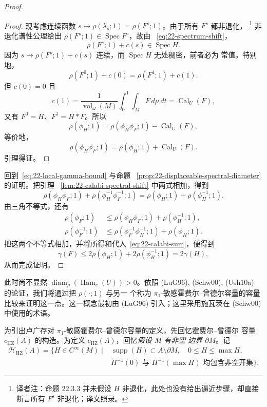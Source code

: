 \begin{proof}
\begin{proof}
现考虑连续函数 $s\mapsto\rho(\lambda_s;1)=\rho(F^s;1)$。由于所有 $F^s$ 都非退化，
\footnote{译者注：命题 22.3.3 并未假设 $H$ 非退化，此处也没有给出逼近步骤，却直接
断言所有 $F^s$ 非退化；译文照录。}
非退化谱性公理给出 $\rho(F^s;1)\in\operatorname{Spec}F^s$，故由
~\eqref{eq:22-spectrum-shift}，
\[
 \rho(F^s;1)+c(s)\in\operatorname{Spec}H.
\]
因为 $s\mapsto\rho(F^s;1)+c(s)$ 连续，而 $\operatorname{Spec}H$ 无处稠密，前者必为
常值。特别地，
\[
 \rho(F^0;1)+c(0)=\rho(F^1;1)+c(1).
\]
但 $c(0)=0$ 且
\[
 c(1)=\frac1{\operatorname{vol}_\omega(M)}
 \int_0^1\int_MF\,d\mu\,dt=\operatorname{Cal}_U(F),
\]
又有 $F^0=H$、$F^1=H*F$。所以
\[
 \rho(\phi_H;1)=\rho(\phi_H\phi_F;1)-\operatorname{Cal}_U(F),
\]
等价地，
\begin{equation}
 \rho(\phi_H\phi_F;1)=\rho(\phi_H;1)+\operatorname{Cal}_U(F).
 \label{eq:22-calabi-shift}
\end{equation}
引理得证。
\end{proof}


回到~\eqref{eq:22-local-gamma-bound} 与命题
~\ref{prop:22-displaceable-spectral-diameter} 的证明。把引理
~\ref{lem:22-calabi-spectral-shift} 中两式相加，得到
\begin{equation}
 \rho(\phi_H\phi_F;1)+\rho(\phi_H^{-1}\phi_F^{-1};1)
 =\rho(\phi_H;1)+\rho(\phi_H^{-1};1).
 \label{eq:22-calabi-sum}
\end{equation}
由三角不等式，还有
\[
 \begin{aligned}
 \rho(\phi_F;1)&\leq\rho(\phi_H\phi_F;1)+\rho(\phi_H^{-1};1),\\
 \rho(\phi_F^{-1};1)&\leq
 \rho(\phi_F^{-1}\phi_H^{-1};1)+\rho(\phi_H;1).
 \end{aligned}
\]
把这两个不等式相加，并将所得和代入~\eqref{eq:22-calabi-sum}，便得到
\[
 \gamma(F)\leq2\rho(\phi_H;1)+2\rho(\phi_H^{-1};1)=2\gamma(H),
\]
从而完成证明。
\end{proof}

此时尚不显然 $\operatorname{diam}_\rho(\operatorname{Ham}_c(U))>0$。依照
(LuG96), (Schw00), (Ush10a) 的论证，我们将通过把 $\rho(\mathord\cdot;1)$ 与另一
个称为 $\pi_1$-敏感霍费尔--曾德尔容量的容量比较来证明这一点。这一概念最初由\personLu{} (LuG96)
引入；这里采用施瓦茨在 (Schw00) 中使用的术语。

为引出卢广存对 $\pi_1$-敏感霍费尔--曾德尔容量的定义，先回忆霍费尔--曾德尔
容量 $c_{\mathrm{HZ}}(A)$ 的构造。为定义 $c_{\mathrm{HZ}}(A)$，回忆\emph{假设 $M$ 有非空
边界} $\partial M$。记
\[
 \begin{aligned}
 \mathcal H_{\mathrm{HZ}}(A)=\{H\in C^\infty(M)\mid{}&
 \operatorname{supp}(H)\subset A\setminus\partial M,
 \quad0\leq H\leq\max H,\\
 &H^{-1}(0)\text{ 与 }H^{-1}(\max H)
 \text{ 均包含非空开集}\}.
 \end{aligned}
\]

